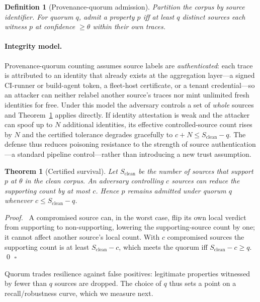 \documentclass[runningheads]{llncs}
\newtheorem{thm}{Theorem}
\newtheorem{defn}{Definition}
\newenvironment{proof}{\par\noindent\textit{Proof.}\ }{\hfill$\square$\par}}{}
\begin{document}
\begin{defn}[Provenance-quorum admission]
Partition the corpus by source identifier. For quorum $q$, admit a property $p$
iff at least $q$ distinct sources each witness $p$ at confidence $\ge\theta$
within their own traces.
\end{defn}

\paragraph{Integrity model.}
Provenance-quorum counting assumes source labels are \emph{authenticated}: each
trace is attributed to an identity that already exists at the aggregation
layer---a signed CI-runner or build-agent token, a fleet-host certificate, or a
tenant credential---so an attacker can neither relabel another source's traces nor
mint unlimited fresh identities for free. Under this model the adversary controls
a set of \emph{whole} sources and Theorem~\ref{thm:survival} applies directly. If
identity attestation is weak and the attacker can spoof up to $N$ additional
identities, its effective controlled-source count rises by $N$ and the certified
tolerance degrades gracefully to $c+N\le S_{\mathrm{clean}}-q$. The defense thus
reduces poisoning resistance to the strength of source authentication---a standard
pipeline control---rather than introducing a new trust assumption.

\begin{thm}[Certified survival]\label{thm:survival}
Let $S_{\mathrm{clean}}$ be the number of sources that support $p$ at $\theta$ in
the clean corpus. An adversary controlling $c$ sources can reduce the supporting
count by at most $c$. Hence $p$ remains admitted under quorum $q$ whenever
$c \le S_{\mathrm{clean}} - q$.
\end{thm}
\begin{proof}
A compromised source can, in the worst case, flip its own local verdict from
supporting to non-supporting, lowering the supporting-source count by one; it
cannot affect another source's local count. With $c$ compromised sources the
supporting count is at least $S_{\mathrm{clean}}-c$, which meets the quorum iff
$S_{\mathrm{clean}}-c\ge q$.
\qed
\end{proof}

Quorum trades resilience against false positives: legitimate properties witnessed
by fewer than $q$ sources are dropped. The choice of $q$ thus sets a point on a
recall/robustness curve, which we measure next.
\end{document}
